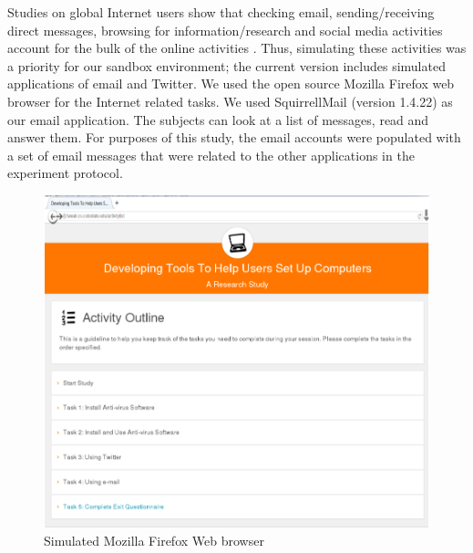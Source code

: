 \documentclass[doctor]{thesis} %
\theoremstyle{plain}
\begin{document}
Studies on global Internet users show that checking email, sending/receiving direct messages, browsing for information/research and social media activities account for the bulk of the online activities \cite{furnell2007, worldinternet2018}. Thus, simulating these activities was a priority for our sandbox environment; the current version includes simulated applications of email and Twitter. We used the open source Mozilla Firefox web browser for the Internet related tasks. We used SquirrellMail (version 1.4.22) as our email application. The subjects can look at a list of messages, read and answer them. For purposes of this study, the email accounts were populated with a set of email messages that were related to the other applications in the experiment protocol.

\begin{figure}[!ht]
  \centering
\includegraphics[width=\columnwidth, keepaspectratio=true]{img/browser.png}
  \caption{Simulated Mozilla Firefox Web browser}
  \label{fig:browser}
\end{figure}
\end{document}
